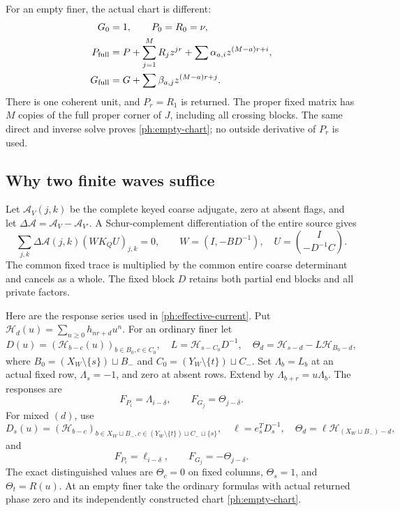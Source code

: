 \documentclass[11pt,a4paper]{amsart}
\numberwithin{equation}{section}
\theoremstyle{plain}
\theoremstyle{definition}
\begin{document}
For an empty finer, the actual chart is different:
\begin{equation}\label{ph:empty-chart}
 \begin{aligned}
 G_0&=1,\qquad P_0=R_0=\nu,\\
 P_{\rm full}&=P+\sum_{j=1}^MR_jz^{jr}
                  +\sum\alpha_{a,i}z^{(M-a)r+i},\\
 G_{\rm full}&=G+\sum\beta_{a,j}z^{(M-a)r+j}.
 \end{aligned}
\end{equation}
There is one coherent unit, and \(P_r=R_1\) is returned.  The proper
fixed matrix has \(M\) copies of the full proper corner of \(J\), including
all crossing blocks.  The same direct and inverse solve proves
\eqref{ph:empty-chart}; no outside derivative of \(P_r\) is used.

\subsection{Why two finite waves suffice}
Let \(\mathcal A_V(j,k)\) be the complete keyed coarse adjugate, zero at
absent flags, and let \(\Delta\mathcal A=\mathcal A_V-\mathcal A_{V'}\).
A Schur-complement differentiation of the entire source gives
\begin{equation}\label{ph:effective-current}
 \sum_{j,k}\Delta\mathcal A(j,k)(WK_QU)_{j,k}=0,
 \qquad W=(I,-BD^{-1}),\quad U=\binom{I}{-D^{-1}C}.
\end{equation}
The common fixed trace is multiplied by the common entire coarse
determinant and cancels as a whole.  The fixed block \(D\) retains both
partial end blocks and all private factors.

Here are the response series used in \eqref{ph:effective-current}.  Put
\(\mathcal H_d(u)=\sum_{n\ge0}h_{nr+d}u^n\).
For an ordinary finer let
\[
 D(u)=(\mathcal H_{b-c}(u))_{b\in B_0,c\in C_0},\quad
 L=\mathcal H_{s-C_0}D^{-1},\quad
 \Theta_d=\mathcal H_{s-d}-L\mathcal H_{B_0-d},
\]
where \(B_0=(X_W\setminus\{s\})\sqcup B_-\) and
\(C_0=(Y_W\setminus\{t\})\sqcup C_-\).
Set \(\Lambda_b=L_b\) at an actual fixed row, \(\Lambda_s=-1\), and
zero at absent rows.  Extend by \(\Lambda_{b+r}=u\Lambda_b\).
The responses are
\[
 F_{P_i}=\Lambda_{i-\delta},\qquad F_{G_j}=\Theta_{j-\delta}.
\]
For mixed \((d)\), use
\[
 D_s(u)=(\mathcal H_{b-c})_{b\in X_W\sqcup B_-,
 c\in(Y_W\setminus\{t\})\sqcup C_-\sqcup\{s\}},\quad
 \ell=e_s^TD_s^{-1},\quad\Theta_d=\ell\mathcal H_{(X_W\sqcup B_-)-d},
\]
and
\[
 F_{P_i}=\ell_{i-\delta},\qquad F_{G_j}=-\Theta_{j-\delta}.
\]
The exact distinguished values are
\(\Theta_c=0\) on fixed columns, \(\Theta_s=1\), and
\(\Theta_t=R(u)\).  At an empty finer take the ordinary formulas with
actual returned phase zero and its independently constructed chart
\eqref{ph:empty-chart}.
\end{document}
